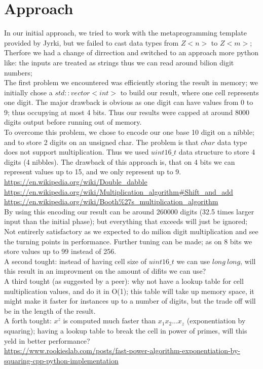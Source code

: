 \documentclass{DIKU-report}
\begin{document}
\section*{Approach}
In our initial approach, we tried to work with the metaprogramming template provided by Jyrki, but we failed to cast data types from $Z<n>$ to $Z<m>$;\\
Therfore we had a change of dirrection and switched to an approach more python like: the inputs are treated as strings thus we can read around bilion digit numbers;\\
The first problem we encountered was efficiently storing the result in memory; we initially chose a $std::vector<int>$ to build our result, where one cell represents one digit. The major drawback is obvious as one digit can have values from 0 to 9; thus occupying at most 4 bits. Thus our results were capped at around 8000 digits output before running out of memory.\\
To overcome this problem, we chose to encode our one base 10 digit on a nibble; and to store 2 digits on an unsigned char. The problem is that $char$ data type does not support multiplication. Thus we used $uint16\_t$ data structure to store 4 digits (4 nibbles). The drawback of this approach is, that on 4 bits we can represent values up to 15, and we only represent up to 9.\\
\url{https://en.wikipedia.org/wiki/Double_dabble}\\
\url{https://en.wikipedia.org/wiki/Multiplication_algorithm#Shift_and_add}\\
\url{https://en.wikipedia.org/wiki/Booth%27s_multiplication_algorithm}\\
By using this encoding our result can be around 260000 digits (32.5 times larger input than the initial phase); but everything that exceeds will just be ignored; Not entirerly satisfactory as we expected to do milion digit multiplication and see the turning points in performance. Further tuning can be made; as on 8 bits we store values up to 99 instead of 256.\\
A second tought: instead of having cell size of $uint16\_t$ we can use $long\ long$, will this result in an improvment on the amount of difits we can use?\\
A third tought (as suggested by a peer): why not have a lookup table for cell multiplication values, and do it in O(1); this table will take up memory space, it might make it faster for instances up to a number of digits, but the trade off will be in the length of the result.\\
A forth tought: $x^{z}$ is computed much faster than $x_1x_2...x_z$ (exponentiation by squaring); having a lookup table to break the cell in power of primes, will this yeld in better performance? \\
\url{https://www.rookieslab.com/posts/fast-power-algorithm-exponentiation-by-squaring-cpp-python-implementation}
\end{document}
